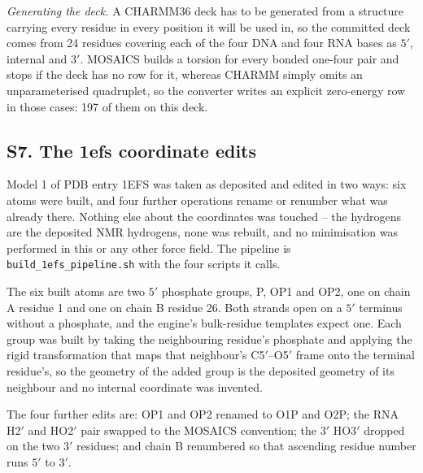 \emph{Generating the deck.} A CHARMM36 deck has to be generated from a
structure carrying every residue in every position it will be used in, so the
committed deck comes from 24 residues covering each of the four DNA and four RNA
bases as $5'$, internal and $3'$. MOSAICS builds a torsion for every bonded
one-four pair and stops if the deck has no row for it, whereas CHARMM simply
omits an unparameterised quadruplet, so the converter writes an explicit
zero-energy row in those cases: 197 of them on this deck.

\subsection*{S7. The 1efs coordinate edits}

Model 1 of PDB entry 1EFS was taken as deposited and edited in two ways:
six atoms were built, and four further operations rename or renumber what was
already there. Nothing else about the coordinates was touched -- the hydrogens
are the deposited NMR hydrogens, none was rebuilt, and no minimisation was
performed in this or any other force field. The pipeline is
\texttt{build\_1efs\_pipeline.sh} with the four scripts it calls.

The six built atoms are two $5'$ phosphate groups, P, OP1 and OP2, one on
chain A residue 1 and one on chain B residue 26. Both strands open on a $5'$
terminus without a phosphate, and the engine's bulk-residue templates expect
one. Each group was built by taking the neighbouring residue's phosphate and
applying the rigid transformation that maps that neighbour's C5$'$--O5$'$ frame
onto the terminal residue's, so the geometry of the added group is the deposited
geometry of its neighbour and no internal coordinate was invented.

The four further edits are: OP1 and OP2 renamed to O1P and O2P; the RNA
H2$'$ and HO2$'$ pair swapped to the MOSAICS convention; the $3'$ HO3$'$ dropped
on the two $3'$ residues; and chain B renumbered so that ascending residue
number runs $5'$ to $3'$.
